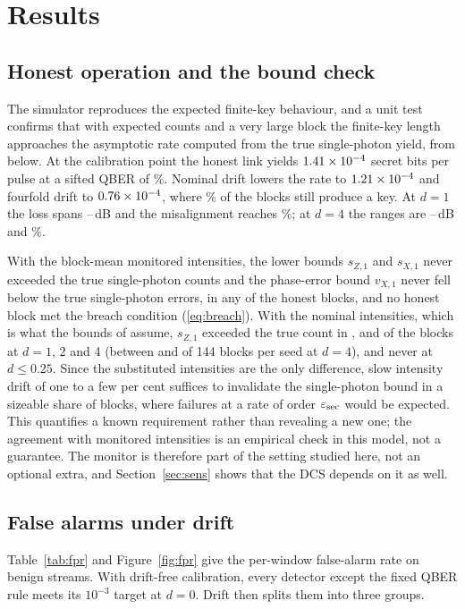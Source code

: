 \section{Results}\label{sec:results}

\subsection{Honest operation and the bound check}
The simulator reproduces the expected finite-key behaviour, and a unit test confirms that with expected counts and a very large block the finite-key length approaches the asymptotic rate computed from the true single-photon yield, from below. At the calibration point the honest link yields $1.41\times10^{-4}$ secret bits per pulse at a sifted QBER of \EZDZero\%. Nominal drift lowers the rate to $1.21\times10^{-4}$ and fourfold drift to $0.76\times10^{-4}$, where \keyposDFour\% of the blocks still produce a key. At $d=1$ the loss spans \lossminDOne--\lossmaxDOne\,dB and the misalignment reaches \edmaxDOne\%; at $d=4$ the ranges are \lossminDFour--\lossmaxDFour\,dB and \edmaxDFour\%.

With the block-mean monitored intensities, the lower bounds $s_{Z,1}$ and $s_{X,1}$ never exceeded the true single-photon counts and the phase-error bound $v_{X,1}$ never fell below the true single-photon errors, in any of the \nBlocksHonest{} honest blocks, and no honest block met the breach condition (\ref{eq:breach}). With the nominal intensities, which is what the bounds of \cite{lim2014} assume, $s_{Z,1}$ exceeded the true count in \violNomDOne, \violNomDTwo{} and \violNomDFour{} of the \nBlocksHonestDOne{} blocks at $d=1$, 2 and 4 (between \violNomSeedMinDFour{} and \violNomSeedMaxDFour{} of 144 blocks per seed at $d=4$), and never at $d\le0.25$. Since the substituted intensities are the only difference, slow intensity drift of one to a few per cent suffices to invalidate the single-photon bound in a sizeable share of blocks, where failures at a rate of order $\varepsilon_{\rm sec}$ would be expected. This quantifies a known requirement \cite{wang2007,mizutani2015,zhang2017} rather than revealing a new one; the agreement with monitored intensities is an empirical check in this model, not a guarantee. The monitor is therefore part of the setting studied here, not an optional extra, and Section~\ref{sec:sens} shows that the DCS depends on it as well.

\subsection{False alarms under drift}\label{sec:fpr-results}
Table~\ref{tab:fpr} and Figure~\ref{fig:fpr} give the per-window false-alarm rate on benign streams. With drift-free calibration, every detector except the fixed QBER rule meets its $10^{-3}$ target at $d=0$. Drift then splits them into three groups.


